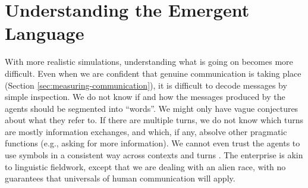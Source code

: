 \section{Understanding the Emergent Language}
\label{sec:understanding-emergent-language}

With more realistic simulations, understanding
what is going on becomes more difficult. Even when we are confident
that genuine communication is taking place (Section
\ref{sec:measuring-communication}), it is difficult to decode messages
by simple inspection. We do not know if and how the messages produced
by the agents should be segmented into ``words''. We might only have
vague conjectures about what they refer to. If there are multiple
turns, we do not know which turns are mostly information exchanges,
and which, if any, absolve other pragmatic functions (e.g., asking for more information). We cannot even
trust the agents to use symbols in a consistent way across contexts
and turns \cite{Bogin:etal:2018}. The enterprise is akin to
linguistic fieldwork, except that we are dealing with an alien race,
with no guarantees that universals of human communication will
apply.%


